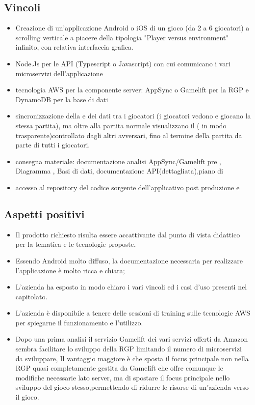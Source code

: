 \subsection{Vincoli}
\begin{itemize}
\item Creazione di un'applicazione Android o iOS di un gioco (da 2 a 6 giocatori) a scrolling verticale a piacere della tipologia "Player versus environment" infinito, con relativa interfaccia grafica.
\item Node.Js per le API (Typescript o Javascript) con cui comunicano i vari microservizi dell'applicazione
\item tecnologia AWS per la componente server: AppSync o Gamelift per la RGP e DynamoDB per la base di dati    
\item sincronizzazione della e dei dati tra i giocatori (i giocatori vedono e giocano la stessa partita), ma oltre alla partita normale visualizzano il ( in modo trasparente)controllato dagli altri avversari, fino al termine della partita da parte di tutti i giocatori.
\item consegna materiale: documentazione analisi AppSync/Gamelift pre , Diagramma  , Basi di dati, documentazione API(dettagliata),piano di 
\item accesso al repository del codice sorgente dell'applicativo post produzione e  
\end{itemize}

\subsection{Aspetti positivi}
\begin{itemize}
\item Il prodotto richiesto risulta essere accattivante dal punto di vista didattico per la tematica e le tecnologie proposte.
\item Essendo Android molto diffuso, la documentazione necessaria per realizzare l'applicazione è molto ricca e chiara;
\item L'azienda ha esposto in modo chiaro i vari vincoli ed i casi d'uso presenti nel capitolato.
\item L'azienda \`e disponibile a tenere delle sessioni di training sulle tecnologie AWS per spiegarne il funzionamento e l'utilizzo.
\item Dopo una prima analisi il servizio Gamelift dei vari servizi offerti da Amazon sembra facilitare lo sviluppo della RGP limitando il numero di microservizi da sviluppare, Il vantaggio maggiore è che sposta il focus principale non nella RGP quasi completamente gestita da Gamelift che offre comunque le modifiche necessarie lato server, ma di spostare il focus principale nello sviluppo del gioco stesso,permettendo di ridurre le risorse  di un’azienda verso il gioco.
\end{itemize}
